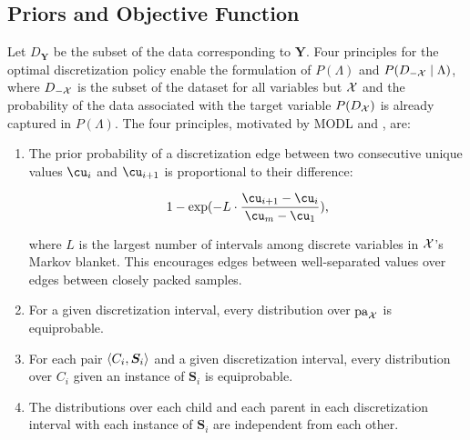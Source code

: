 



\subsection{Priors and Objective Function}

Let $D_{\bm{Y}}$ be the subset of the data corresponding to $\bm{Y}$.
Four principles for the optimal discretization policy enable the formulation of $P(\Lambda)$ and $P(D_{-\mathcal{X}} \mid \Lambda)$, where $D_{-\mathcal{X}}$ is the subset of the dataset for all variables but $\mathcal{X}$ and the probability of the data associated with the target variable $P(D_{\mathcal{X}})$ is already captured in $P(\Lambda)$.
The four principles, motivated by MODL and \cite{Lustgarten_2011}, are:

\begin{enumerate}
\item The prior probability of a discretization edge between two consecutive unique values $\cu_i$ and $\cu_{i+1}$ is proportional to their difference:

  \begin{equation}
  1 - {\exp(- L \cdot {\frac{\cu_{i+1} - \cu_i}{\cu_m - \cu_1}})}\text{,}
  \end{equation}

where $L$ is the largest number of intervals among discrete variables in $\mathcal{X}$'s Markov blanket.
This encourages edges between well-separated values over edges between closely packed samples.

\item For a given discretization interval, every distribution over $\operatorname{pa}_{\mathcal{X}}$ is equiprobable.
\item For each pair $\langle C_i,\bm{S}_i \rangle$ and a given discretization interval, every distribution over $C_i$ given an instance of $\bm{S}_i$ is equiprobable.
\item The distributions over each child and each parent in each discretization interval with each instance of $\bm{S}_i$ are independent from each other.
\end{enumerate}

